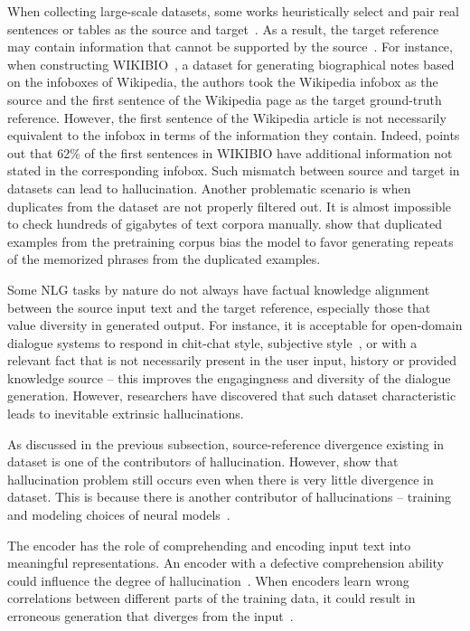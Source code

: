When collecting large-scale datasets, some works heuristically select and pair real sentences or tables as the source and target~. As a result, the target reference may contain information that cannot be supported by the source~. 
For instance, when constructing WIKIBIO~, a dataset for generating biographical notes based on the infoboxes of Wikipedia, the authors took the Wikipedia infobox as the source and the first sentence of the Wikipedia page as the target ground-truth reference. However, the first sentence of the Wikipedia article is not necessarily equivalent to the infobox in terms of the information they contain. Indeed,  points out that 62\% of the first sentences in WIKIBIO have additional information not stated in the corresponding infobox. Such mismatch between source and target in datasets can lead to hallucination.
Another problematic scenario is when duplicates from the dataset are not properly filtered out. It is almost impossible to check hundreds of gigabytes of text corpora manually.  show that duplicated examples 
from the pretraining corpus bias the model to favor generating repeats of the memorized phrases from the duplicated examples.

Some NLG tasks by nature do not always have factual knowledge alignment between the source input text and the target reference, especially those that value diversity in generated output. 
For instance, it is acceptable for open-domain dialogue systems to respond in chit-chat style, subjective style~, or with a relevant fact that is not necessarily present in the user input, history or provided knowledge source -- this improves the engagingness and diversity of the dialogue generation. However, researchers have discovered that such dataset characteristic leads to inevitable extrinsic hallucinations.

As discussed in the previous subsection, source-reference divergence existing in dataset is one of the contributors of hallucination. However,  show that hallucination problem still occurs even when there is very little divergence in dataset. This is because there is another contributor of hallucinations -- training and modeling choices of neural models~.

The encoder has the role of comprehending and encoding input text into meaningful representations. An encoder with a defective comprehension ability could influence the degree of hallucination~.
When encoders learn wrong correlations between different parts of the training data, it could result in erroneous generation that diverges from the input~.

